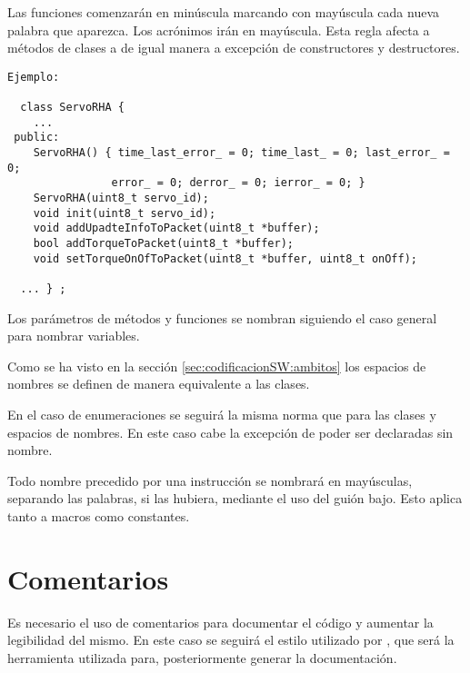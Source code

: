 Las funciones comenzarán en minúscula marcando con mayúscula cada nueva palabra que aparezca. Los acrónimos irán en mayúscula. Esta regla afecta a métodos de clases a de igual manera a excepción de constructores y destructores.
\\ 

    \lstset{language=C, breaklines=true, basicstyle=\footnotesize}
    \begin{lstlisting}[frame=single]
Ejemplo: 
    
  class ServoRHA {
 	...
 public:
    ServoRHA() { time_last_error_ = 0; time_last_ = 0; last_error_ = 0;
                error_ = 0; derror_ = 0; ierror_ = 0; }
    ServoRHA(uint8_t servo_id);
    void init(uint8_t servo_id);
    void addUpadteInfoToPacket(uint8_t *buffer);
    bool addTorqueToPacket(uint8_t *buffer);
    void setTorqueOnOfToPacket(uint8_t *buffer, uint8_t onOff);

  ... } ;

    \end{lstlisting}
    
	
Los parámetros de métodos y funciones se nombran siguiendo el caso general para nombrar variables.
    

Como se ha visto en la sección \ref{sec:codificacionSW:ambitos} los espacios de nombres se definen de manera equivalente a las clases. 


En el caso de enumeraciones se seguirá la misma norma que para las clases y espacios de nombres. En este caso cabe la excepción de poder ser declaradas sin nombre.


Todo nombre precedido por una instrucción  se nombrará en mayúsculas, separando las palabras, si las hubiera, mediante el uso del guión bajo. Esto aplica tanto a macros como constantes.

\section{Comentarios}\label{sec:codificacionSW:comentarios}

Es necesario el uso de comentarios para documentar el código y aumentar la legibilidad del mismo. En este caso se seguirá el estilo utilizado por , que será la herramienta utilizada para, posteriormente generar la documentación. 


